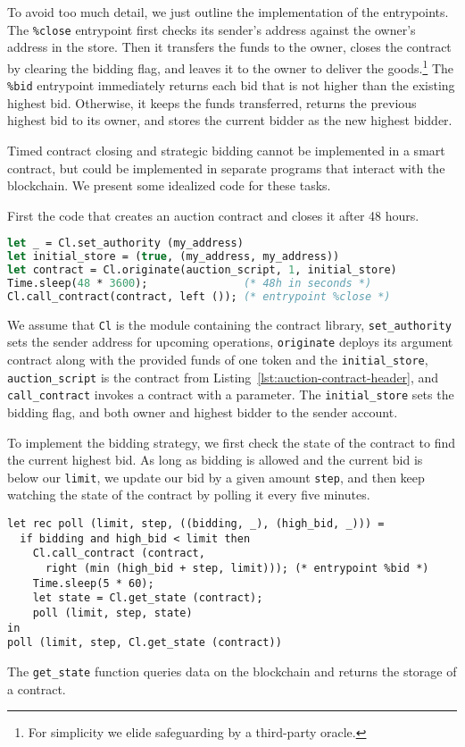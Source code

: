\documentclass[a4paper]{llncs}
\begin{document}
To avoid too much detail, we just outline the implementation of the entrypoints. The
\lstinline/%close/ entrypoint first checks its sender's address
against the owner's address in the store. Then it transfers the funds
to the owner, closes the contract by clearing the bidding flag, and
leaves it to the owner to deliver the
goods.\footnote{For simplicity we elide safeguarding by a third-party oracle.}
The \lstinline/%bid/ entrypoint immediately returns each bid that is not higher
than the existing highest bid. Otherwise, it keeps the funds
transferred, returns the previous highest bid to its owner, and stores
the current bidder as the new highest bidder.


Timed contract closing and strategic bidding cannot be implemented in
a smart contract, but could be implemented in separate programs that
interact with the blockchain. We present some idealized code for these tasks.

First the code that creates an auction contract and closes it after 48 hours. 
\begin{lstlisting}[language=Caml,numbers=none,basicstyle=\small]
let _ = Cl.set_authority (my_address)
let initial_store = (true, (my_address, my_address))
let contract = Cl.originate(auction_script, 1, initial_store)
Time.sleep(48 * 3600);               (* 48h in seconds *)
Cl.call_contract(contract, left ()); (* entrypoint %close *)
\end{lstlisting}
We assume that \lstinline/Cl/ is the module containing the contract
library, \lstinline{set_authority} sets the sender address for
upcoming operations,  \lstinline/originate/ deploys its argument contract along
with the provided funds of one token and the \lstinline/initial_store/, 
\lstinline{auction_script} is the contract from Listing~\ref{lst:auction-contract-header}, and 
\lstinline{call_contract} invokes a contract with a parameter. The
\lstinline{initial_store} sets the bidding flag, and both owner and
highest bidder to the sender account.


To implement the bidding strategy, we first check the state of the
contract to find the current highest bid. As long as bidding is
allowed and the current bid is below our \lstinline/limit/, we update
our bid by a given amount \lstinline/step/, and then keep watching the state of the contract by
polling it every five minutes. 
\begin{lstlisting}[numbers=none,basicstyle=\small]
let rec poll (limit, step, ((bidding, _), (high_bid, _))) =
  if bidding and high_bid < limit then
    Cl.call_contract (contract, 
      right (min (high_bid + step, limit))); (* entrypoint %bid *)
    Time.sleep(5 * 60);
    let state = Cl.get_state (contract);
    poll (limit, step, state)
in
poll (limit, step, Cl.get_state (contract))
\end{lstlisting}
The \lstinline{get_state} function queries data on
the blockchain and returns the storage of a contract. 
\end{document}
